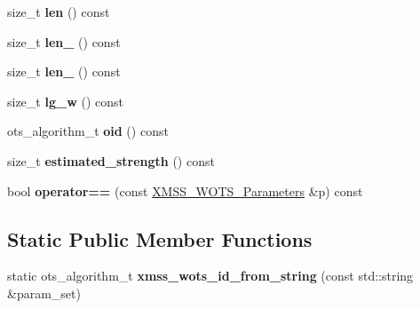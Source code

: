 \begin{DoxyCompactItemize}
\item 
\mbox{\label{class_botan_1_1_x_m_s_s___w_o_t_s___parameters_ab51271c681946048cafb71fa29d86b31}} 
size\+\_\+t {\bfseries len} () const
\item 
\mbox{\label{class_botan_1_1_x_m_s_s___w_o_t_s___parameters_a2b3177d186feacaa12bb8f72a88ac971}} 
size\+\_\+t {\bfseries len\+\_} () const
\item 
\mbox{\label{class_botan_1_1_x_m_s_s___w_o_t_s___parameters_a008bf71408eebbd39f282df0ff0c816d}} 
size\+\_\+t {\bfseries len\+\_} () const
\item 
\mbox{\label{class_botan_1_1_x_m_s_s___w_o_t_s___parameters_ad0418aae7bcd69d71f7444d9d6824d3a}} 
size\+\_\+t {\bfseries lg\+\_\+w} () const
\item 
\mbox{\label{class_botan_1_1_x_m_s_s___w_o_t_s___parameters_a8edc4cb8a1664deb7bfb99de71ff132c}} 
ots\+\_\+algorithm\+\_\+t {\bfseries oid} () const
\item 
\mbox{\label{class_botan_1_1_x_m_s_s___w_o_t_s___parameters_aa1ee31abc2eb95e14e5a68293141ca0c}} 
size\+\_\+t {\bfseries estimated\+\_\+strength} () const
\item 
\mbox{\label{class_botan_1_1_x_m_s_s___w_o_t_s___parameters_aef4a3e78fc89d9ec1ee8a5756cec938b}} 
bool {\bfseries operator==} (const \mbox{\hyperlink{class_botan_1_1_x_m_s_s___w_o_t_s___parameters}{X\+M\+S\+S\+\_\+\+W\+O\+T\+S\+\_\+\+Parameters}} \&p) const
\end{DoxyCompactItemize}
\subsection*{Static Public Member Functions}
\begin{DoxyCompactItemize}
\item 
\mbox{\label{class_botan_1_1_x_m_s_s___w_o_t_s___parameters_ae4e07fbc2279204e3ff06c2530e32b69}} 
static ots\+\_\+algorithm\+\_\+t {\bfseries xmss\+\_\+wots\+\_\+id\+\_\+from\+\_\+string} (const std\+::string \&param\+\_\+set)
\end{DoxyCompactItemize}


